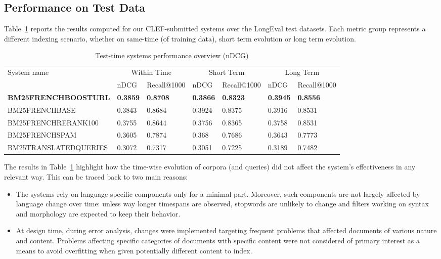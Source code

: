 \subsection{Performance on Test Data}
\label{subsec:perfs}
Table~\ref{tab:sysperftest} reports the results computed for our CLEF-submitted systems over the LongEval test datasets. Each metric group represents a different indexing scenario, whether on same-time (of training data), short term evolution or long term evolution.
\begin{table}[tb]
  \caption{Test-time systems performance overview (nDCG)}
  \label{tab:sysperftest}
  \centering
  \begin{tabular}{|l|l|l|l|l|l|l|}
    \toprule
    \multirow{2}{*}{System name} & \multicolumn{2}{|c|}{Within Time} & \multicolumn{2}{|c|}{Short Term} & \multicolumn{2}{|c|}{Long Term}\\ 
    & nDCG & Recall@1000 & nDCG & Recall@1000 & nDCG & Recall@1000\\
    \midrule
    \textbf{BM25FRENCHBOOSTURL} & \textbf{0.3859} & \textbf{0.8708} & \textbf{0.3866} & \textbf{0.8323} & \textbf{0.3945} & \textbf{0.8556}\\
    BM25FRENCHBASE & 0.3843 & 0.8684 & 0.3924 & 0.8375 & 0.3916 & 0.8531\\
    BM25FRENCHRERANK100 & 0.3755 & 0.8644 & 0.3756 & 0.8365 & 0.3758 & 0.8531\\
    BM25FRENCHSPAM & 0.3605 & 0.7874 & 0.368 & 0.7686 & 0.3643 & 0.7773\\
    BM25TRANSLATEDQUERIES & 0.3072 & 0.7317 & 0.3051 & 0.7225 & 0.3189 & 0.7482\\
  \bottomrule
\end{tabular}
\end{table}
\par The results in Table~\ref{tab:sysperftest} highlight how the time-wise evolution of corpora (and queries) did not affect the system's effectiveness in any relevant way. This can be traced back to two main reasons:
\begin{itemize}
    \item The systems rely on language-specific components only for a minimal part. Moreover, such components are not largely affected by language change over time: unless way longer timespans are observed, stopwords are unlikely to change and filters working on syntax and morphology are expected to keep their behavior.
    \item At design time, during error analysis, changes were implemented targeting frequent problems that affected documents of various nature and content. Problems affecting specific categories of documents with specific content were not considered of primary interest as a means to avoid overfitting when given potentially different content to index.
\end{itemize}


